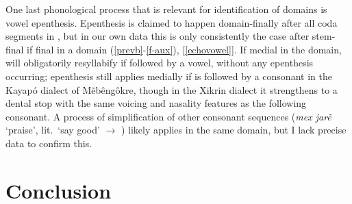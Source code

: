 \documentclass[output=paper]{langscibook}
\begin{document}
One last phonological process that is relevant for identification of domains is vowel epenthesis. Epenthesis is claimed to happen domain-finally after all coda segments in \citet{stout-thomson:fonemica}, but in our own data this is only consistently the case after stem-final  if final in a domain (\ref{prevb}-\ref{f-aux}), [\ref{echovowel}]. If medial in the domain,  will obligatorily resyllabify if followed by a vowel, without any epenthesis occurring; epenthesis still applies medially if  is followed by a consonant in the Kayapó dialect of Mẽbêngôkre, though in the Xikrin dialect it strengthens to a dental stop with the same voicing and nasality features as the following consonant. A process of simplification of other consonant sequences ({\em mex jarẽ} `praise', lit.\ `say good' $\rightarrow$ \phofont{[mɛtʃaˈɾẽ]}) likely applies in the same domain, but I lack precise data to confirm this.






\section{Conclusion}

\end{document}
